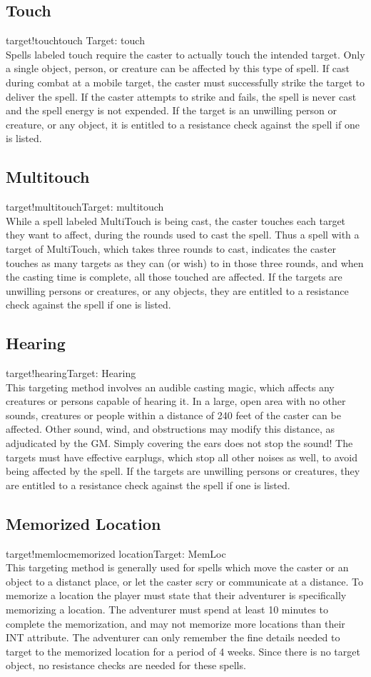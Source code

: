 \subsection{Touch}
target!touchtouch
Target: touch\\
Spells labeled touch require the caster to actually touch the intended target. Only a single object, person, or creature can be affected by this type of spell. If cast during combat at a mobile target, the caster must successfully strike the target to deliver the spell. If the caster attempts to strike and fails, the spell is never cast and the spell energy is not expended. If the target is an unwilling person or creature,
or any object, it is entitled to a resistance check against the spell if one is listed.
\subsection{Multitouch}
target!multitouchTarget: multitouch\\
While a spell labeled MultiTouch is being cast, the caster touches each target they want to affect, during the rounds used to cast the spell. Thus a spell with a target of MultiTouch, which takes three rounds to cast, indicates the caster touches as many targets as they can (or wish) to in those three rounds, and when the casting time is complete, all those touched are affected. If the targets are unwilling persons or creatures, or any objects, they are entitled to a resistance check against the spell if one is listed.
\subsection{Hearing}
target!hearingTarget: Hearing\\
This targeting method involves an audible casting magic, which affects any creatures or persons capable of hearing it. In a large, open area with no other sounds,  creatures or people within a distance of 240 feet of the caster can be affected. Other sound, wind, and obstructions may modify this distance, as adjudicated by the GM. Simply covering the ears does not stop the sound! The targets must have effective earplugs, which stop all other noises as well, to avoid being affected by the spell. If the targets are unwilling persons or creatures, they are entitled to a resistance check against the spell if one is listed.
\subsection{Memorized Location}
target!memlocmemorized locationTarget: MemLoc\\
This targeting method is generally used for spells which move the caster or an object to a distanct place, or let the caster scry or communicate at a distance. To memorize a location the player must state that their adventurer is specifically memorizing a location. The adventurer must spend at least 10 minutes to complete the memorization, and may not memorize more locations than their INT attribute. The adventurer can only remember the fine details needed to target to the memorized location for a period of 4 weeks. Since there is no target object, no resistance checks are needed for these spells.
